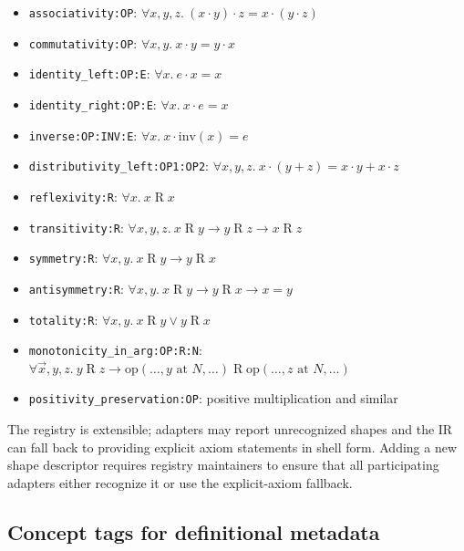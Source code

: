 \documentclass[11pt,letterpaper]{article}
\theoremstyle{definition}
\theoremstyle{remark}
\begin{document}
\begin{itemize}[leftmargin=2em]
  \item \texttt{associativity:OP}: $\forall x, y, z.\ (x \cdot y) \cdot z = x \cdot (y \cdot z)$
  \item \texttt{commutativity:OP}: $\forall x, y.\ x \cdot y = y \cdot x$
  \item \texttt{identity\_left:OP:E}: $\forall x.\ e \cdot x = x$
  \item \texttt{identity\_right:OP:E}: $\forall x.\ x \cdot e = x$
  \item \texttt{inverse:OP:INV:E}: $\forall x.\ x \cdot \mathrm{inv}(x) = e$
  \item \texttt{distributivity\_left:OP1:OP2}:
        $\forall x, y, z.\ x \cdot (y + z) = x \cdot y + x \cdot z$
  \item \texttt{reflexivity:R}: $\forall x.\ x \mathrel{R} x$
  \item \texttt{transitivity:R}: $\forall x, y, z.\ x \mathrel{R} y \to y \mathrel{R} z \to x \mathrel{R} z$
  \item \texttt{symmetry:R}: $\forall x, y.\ x \mathrel{R} y \to y \mathrel{R} x$
  \item \texttt{antisymmetry:R}: $\forall x, y.\ x \mathrel{R} y \to y \mathrel{R} x \to x = y$
  \item \texttt{totality:R}: $\forall x, y.\ x \mathrel{R} y \vee y \mathrel{R} x$
  \item \texttt{monotonicity\_in\_arg:OP:R:N}: $\forall \vec{x}, y, z.\ y \mathrel{R} z \to \mathrm{op}(\dots, y \text{ at } N, \dots) \mathrel{R} \mathrm{op}(\dots, z \text{ at } N, \dots)$
  \item \texttt{positivity\_preservation:OP}: positive multiplication and similar
\end{itemize}

The registry is extensible; adapters may report unrecognized shapes
and the IR can fall back to providing explicit axiom statements in
shell form. Adding a new shape descriptor requires registry
maintainers to ensure that all participating adapters either
recognize it or use the explicit-axiom fallback.

\subsection{Concept tags for definitional metadata}
\label{app:concepts}
\end{document}
